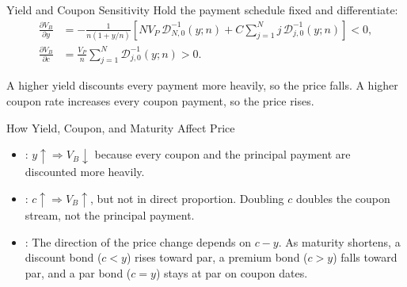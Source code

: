 \documentclass[aspectratio=169,11pt]{beamer}
\begin{document}
\begin{frame}{Yield and Coupon Sensitivity}
  \vspace{-0.2em}
  Hold the payment schedule fixed and differentiate:
  \[
    \begin{aligned}
      \frac{\partial V_B}{\partial y}
        &=-\frac{1}{n(1+y/n)}\left[NV_P\,\mathcal D_{N,0}^{-1}(y;n)
          +C\sum_{j=1}^{N}j\,\mathcal D_{j,0}^{-1}(y;n)\right]<0,\\[0.2em]
      \frac{\partial V_B}{\partial c}
        &=\frac{V_P}{n}\sum_{j=1}^{N}\mathcal D_{j,0}^{-1}(y;n)>0 .
    \end{aligned}
  \]

  \vspace{0.1em}
  A higher yield discounts every payment more heavily, so the price falls. A
  higher coupon rate increases every coupon payment, so the price rises.

\end{frame}

\begin{frame}{How Yield, Coupon, and Maturity Affect Price}
  \vspace{0.3em}
  \begin{itemize}\setlength{\itemsep}{0.55em}
    \item {}: $y\uparrow \Rightarrow V_B\downarrow$ because every
      coupon and the principal payment are discounted more heavily.
    \item {}: $c\uparrow \Rightarrow V_B\uparrow$, but not in
      direct proportion. Doubling $c$ doubles the coupon stream, not the
      principal payment.
    \item {}: The direction of the price change depends
      on $c-y$. As maturity shortens, a discount bond ($c<y$) rises toward par, a
      premium bond ($c>y$) falls toward par, and a par bond ($c=y$) stays at par
      on coupon dates.
  \end{itemize}

\end{frame}
\end{document}
